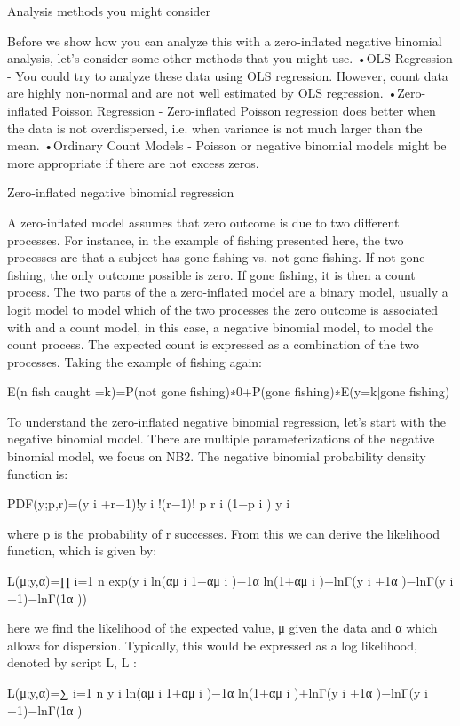 Analysis methods you might consider

Before we show how you can analyze this with a zero-inflated negative binomial analysis, let's consider some other methods that you might use.
 •OLS Regression - You could try to analyze these data using OLS regression. However, count data are highly non-normal and are not well estimated by OLS regression.
•Zero-inflated Poisson Regression - Zero-inflated Poisson regression does better when the data is not overdispersed, i.e. when variance is not much larger than the mean. 
•Ordinary Count Models - Poisson or negative binomial models might be more appropriate if there are not excess zeros.
 
Zero-inflated negative binomial regression

A zero-inflated model assumes that zero outcome is due to two different processes. For instance, in the example of fishing presented here, the two processes are that a subject has gone fishing vs. not gone fishing. If not gone fishing, the only outcome possible is zero. If gone fishing, it is then a count process. The two parts of the a zero-inflated model are a binary model, usually a logit model to model which of the two processes the zero outcome is associated with and a count model, in this case, a negative binomial model, to model the count process. The expected count is expressed as a combination of the two processes. Taking the example of fishing again:
 
E(n fish caught =k)=P(not gone fishing)∗0+P(gone fishing)∗E(y=k|gone fishing) 

To understand the zero-inflated negative binomial regression, let's start with the negative binomial model. There are multiple parameterizations of the negative binomial model, we focus on NB2. The negative binomial probability density function is:

PDF(y;p,r)=(y i +r−1)!y i !(r−1)! p r i (1−p i ) y i   

where p  is the probability of r  successes. From this we can derive the likelihood function, which is given by:

L(μ;y,α)=∏ i=1 n exp(y i ln(αμ i 1+αμ i  )−1α ln(1+αμ i )+lnΓ(y i +1α )−lnΓ(y i +1)−lnΓ(1α )) 

here we find the likelihood of the expected value, μ  given the data and α  which allows for dispersion. Typically, this would be expressed as a log likelihood, denoted by script L, L :

L(μ;y,α)=∑ i=1 n y i ln(αμ i 1+αμ i  )−1α ln(1+αμ i )+lnΓ(y i +1α )−lnΓ(y i +1)−lnΓ(1α ) 

